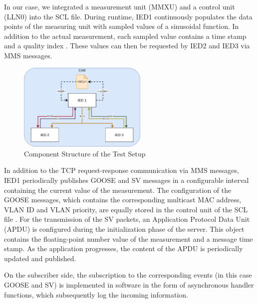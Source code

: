 \documentclass[conference, onecolumn, a4paper]{IEEEtran}
\begin{document}
\smallskip
In our case, we integrated a measurement unit (MMXU) \cite[p. 268]{IEC61850-7-4:2010} and a control unit (LLN0) \cite[p. 164]{IEC61850-7-4:2010} 
into the SCL file. During runtime, IED1 continuously populates the data points of the measuring unit with sampled values of a sinusoidal function. In 
addition to the actual measurement, each sampled value contains a time stamp and a quality index \cite[p. 61ff]{IEC61850-7-3:2010}. These values can 
then be requested by IED2 and IED3 via MMS messages.

\begin{figure}[h]
    \centering
    \includegraphics[width=0.55\textwidth]{images/TestSetupIEDs.png}
    \caption{Component Structure of the Test Setup}
    \label{image:MACsecTestSetup}
\end{figure}

\noindent In addition to the TCP request-response communication via MMS messages, IED1 periodically publishes GOOSE and SV messages in a configurable 
interval containing the current value of the measurement. The configuration of the GOOSE messages, which contains the corresponding multicast MAC address, 
VLAN ID and VLAN priority, are equally stored in the control unit of the SCL file \cite[p. 189]{IEC61850-8-1:2011}. For the transmission of the SV 
packets, an Application Protocol Data Unit (APDU) is configured during the initialization phase of the server. This object contains the floating-point 
number value of the measurement and a message time stamp. As the application progresses, the content of the APDU is periodically updated and published. 

\smallskip 
On the subscriber side, the subscription to the corresponding events (in this case GOOSE and SV) is implemented in software in the form of asynchronous 
handler functions, which subsequently log the incoming information. 

\end{document}
